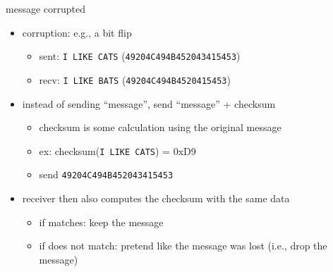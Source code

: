 \begin{frame}{message corrupted}
\begin{itemize}
\item corruption: e.g., a bit flip
	\begin{itemize}
	\item sent: \texttt{I LIKE CATS} (\texttt{49204C494B452043415453})
	\item recv: \texttt{I LIKE BATS} (\texttt{49204C494B4520415453})
	\end{itemize}
\item instead of sending ``message'', send ``message'' + checksum
	\begin{itemize}
	\item checksum is some calculation using the original message
	\item ex: checksum(\texttt{I LIKE CATS}) = 0xD9
	\item send \texttt{49204C494B452043415453}
	\end{itemize}
\vspace{.5cm}
\item receiver then also computes the checksum with the same data
	\begin{itemize}
	\item if matches: keep the message
	\item if does not match: pretend like the message was lost (i.e., drop the message)
	\end{itemize}
\end{itemize}
\end{frame}

